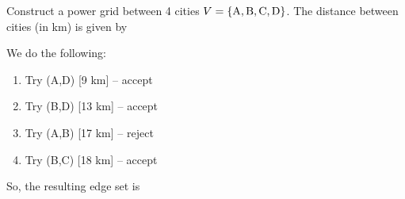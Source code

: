 

Construct a power grid between 4 cities $V=\{ {\rm A},{\rm B},{\rm C},{\rm D}\}$. The distance between cities (in km) is given by
  

\solution
We do the following:
\begin{enumerate}[label=\arabic*.]
\item Try (A,D) [9 km] -- accept
\item Try (B,D) [13 km] -- accept
\item Try (A,B) [17 km] -- reject
\item Try (B,C) [18 km] -- accept  
\end{enumerate}
So, the resulting edge set is 

